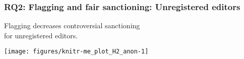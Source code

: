 \documentclass[10pt,xcolor=dvipsnames,aspectratio=169]{beamer}\usepackage[]{graphicx}\usepackage[]{color}
\begin{document}
\begin{frame}\frametitle{RQ2: Flagging and fair sanctioning: Unregistered editors}

\larger 

Flagging decreases controversial sanctioning \\ for unregistered editors. 


\texttt{[image: figures/knitr-me\_plot\_H2\_anon-1]} 


\end{frame}









\end{document}
